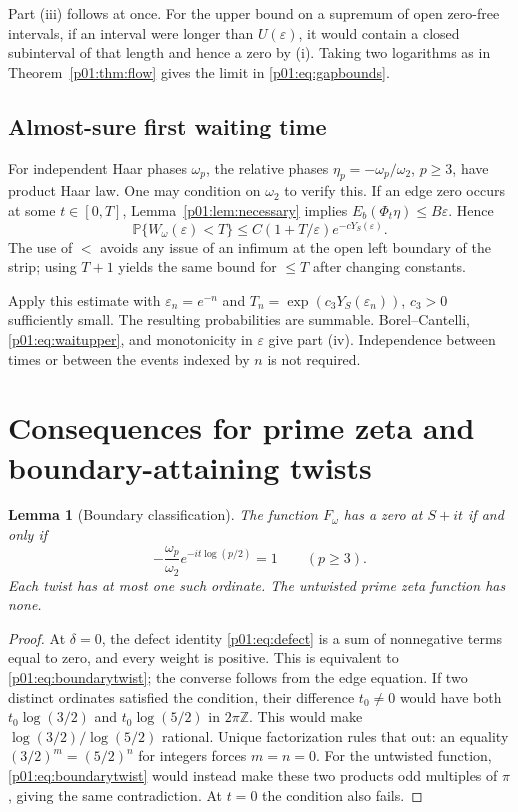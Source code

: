 \documentclass[11pt,letterpaper]{article}
\newtheorem{lemma}[theorem]{Lemma}
\theoremstyle{definition}
\theoremstyle{remark}
\newcommand{\Z}{\mathbb Z}
\newcommand{\eps}{\varepsilon}
\newcommand{\1}{\mathbf 1}
\begin{document}
Part (iii) follows at once. For the upper bound on a supremum of
open zero-free intervals, if an interval were longer than $U(\eps)$,
it would contain a closed subinterval of that length and hence a zero
by (i). Taking two logarithms as in Theorem~\ref{p01:thm:flow} gives the
limit in \eqref{p01:eq:gapbounds}.

\subsection{Almost-sure first waiting time}

For independent Haar phases $\omega_p$, the relative phases
$\eta_p=-\omega_p/\omega_2$, $p\ge3$, have product Haar law. One may
condition on $\omega_2$ to verify this. If an edge zero occurs at
some $t\in[0,T]$, Lemma~\ref{p01:lem:necessary} implies
$E_b(\Phi_t\eta)\le B\eps$. Hence
\begin{equation}\label{p01:eq:zeroprob}
 \mathbb P\{W_\omega(\eps)<T\}
 \le C(1+T/\eps)e^{-cY_S(\eps)}.
\end{equation}
The use of $<$ avoids any issue of an infimum at the open left boundary
of the strip; using $T+1$ yields the same bound for $\le T$ after
changing constants.

Apply this estimate with $\eps_n=e^{-n}$ and
$T_n=\exp(c_3Y_S(\eps_n))$, $c_3>0$ sufficiently small. The resulting
probabilities are summable. Borel--Cantelli, \eqref{p01:eq:waitupper},
and monotonicity in $\eps$ give part (iv). Independence between times
or between the events indexed by $n$ is not required.

\section{Consequences for prime zeta and boundary-attaining twists}

\begin{lemma}[Boundary classification]\label{p01:lem:boundary}
The function $F_\omega$ has a zero at $S+it$ if and only if
\begin{equation}\label{p01:eq:boundarytwist}
 -\frac{\omega_p}{\omega_2}e^{-it\log(p/2)}=1
 \qquad(p\ge3).
\end{equation}
Each twist has at most one such ordinate. The untwisted prime zeta
function has none.
\end{lemma}
\begin{proof}
At $\delta=0$, the defect identity \eqref{p01:eq:defect} is a sum of
nonnegative terms equal to zero, and every weight is positive. This
is equivalent to \eqref{p01:eq:boundarytwist}; the converse follows from
the edge equation.
If two distinct ordinates satisfied the condition, their difference
$t_0\ne0$ would have both $t_0\log(3/2)$ and $t_0\log(5/2)$ in
$2\pi\Z$. This would make
$\log(3/2)/\log(5/2)$ rational. Unique factorization rules that out:
an equality $(3/2)^m=(5/2)^n$ for integers forces $m=n=0$.
For the untwisted function, \eqref{p01:eq:boundarytwist} would instead
make these two products odd multiples of $\pi$, giving the same
contradiction. At $t=0$ the condition also fails.
\end{proof}
\end{document}
